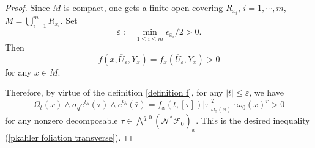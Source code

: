 \documentclass[10pt,a4paper]{amsart}
\def\mc{\mathcal}
\begin{document}
\begin{proof}
		
		Since $M$ is compact, one gets a finite open covering $R_{x_i}$, $i=1,\cdots, m$, $M=\mathop\bigcup_{i=1}^m R_{x_i}$. Set
		$$\varepsilon:=\min_{1\leq i\leq m}\epsilon_{x_i}/2>0.$$
		Then
		$$
		f(x,\overline{U}_{\varepsilon},Y_x)=f_x(\overline{U}_{\varepsilon},Y_x)>0
		$$
		for any $x\in M$.
		
		
		Therefore,  by virtue of  the definition \eqref{definition f},
		for any $|t|\leq \varepsilon$, we have
		$$
		\Omega_{t}(x) \wedge \sigma_{q} e^{\iota_\phi}(\tau) \wedge e^{\iota_{\bar\phi}} (\bar\tau)=f_{x}(t,[\tau])|\tau|^2_{\omega_0(x)}\cdot \omega_0(x)^r>0
		$$
		for any nonzero decomposable $\tau\in \bigwedge^{q,0}(\mc N^*\mc F_0)_x$. This is the desired inequality (\ref{pkahler foliation transverse}).
		
	\end{proof}
\end{document}
